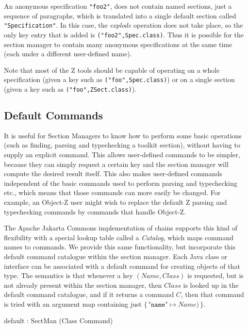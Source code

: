 \documentclass{llncs} %
\begin{document}
An anonymous specification \texttt{"foo2"}, does not contain named
sections, just a sequence of paragraphs, which is translated into
a single default section called \texttt{"Specification"}.
In this case, the \emph{explode} operation does not take place,
so the only key entry that is added is \texttt{("foo2",Spec.class)}.  
Thus it is possible for the section manager to contain many
anonymous specifications at the same time (each under a different
user-defined name).

Note that most of the Z tools should be capable of operating
on a whole specification (given a key such as \texttt{("foo",Spec.class)})
or on a single section (given a key such as \texttt{("foo",ZSect.class)}).


\subsection{Default Commands}

It is useful for Section Managers to know how to perform some basic 
operations (such as finding, parsing and typechecking a toolkit section),
without having to supply an explicit command.  This allows user-defined
commands to be simpler, because they can simply request a certain key and
the section manager will compute the desired result itself.  This also
makes user-defined commands independent of the basic commands used to
perform parsing and typechecking etc., which means that those commands
can more easily be changed.  For example, an Object-Z user might wish
to replace the default Z parsing and typechecking commands by commands
that handle Object-Z.  

The Apache Jakarta Commons implementation of chains supports this
kind of flexibility with a special lookup table called a \emph{Catalog},
which maps command names to commands.  We provide this same
functionality, but incorporate this default command catalogue within 
the section manager.  Each Java class or interface can be associated
with a default command for creating objects of that type.
The semantics is that whenever a key $(Name,Class)$
is requested, but is not already present within the section manager, then
$Class$ is looked up in the default command catalogue, and if it returns
a command $C$, then that command is tried with an argument map containing
just $\{\, \texttt{"name"} \mapsto Name)\, \}$.

\begin{axdef}
  default : SectMan \fun (Class \ffun Command)
\end{axdef}
\end{document}
